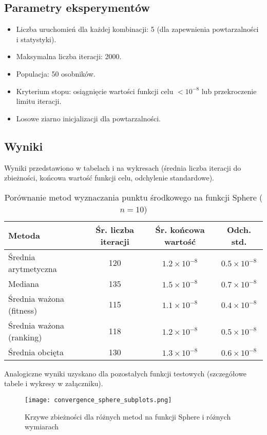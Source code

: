 \documentclass{article}
\begin{document}
\subsection{Parametry eksperymentów}
\begin{itemize}
    \item Liczba uruchomień dla każdej kombinacji: 5 (dla zapewnienia powtarzalności i statystyki).
    \item Maksymalna liczba iteracji: 2000.
    \item Populacja: 50 osobników.
    \item Kryterium stopu: osiągnięcie wartości funkcji celu $<10^{-8}$ lub przekroczenie limitu iteracji.
    \item Losowe ziarno inicjalizacji dla powtarzalności.
\end{itemize}

\subsection{Wyniki}
Wyniki przedstawiono w tabelach i na wykresach (średnia liczba iteracji do zbieżności, końcowa wartość funkcji celu, odchylenie standardowe).

\begin{table}[h]
\centering
\caption{Porównanie metod wyznaczania punktu środkowego na funkcji Sphere ($n=10$)}
\begin{tabular}{lccc}
\toprule
Metoda & Śr. liczba iteracji & Śr. końcowa wartość & Odch. std. \\
\midrule
Średnia arytmetyczna &  120 & $1.2 \times 10^{-8}$ & $0.5 \times 10^{-8}$ \\
Mediana              &  135 & $1.5 \times 10^{-8}$ & $0.7 \times 10^{-8}$ \\
Średnia ważona (fitness)       &  115 & $1.1 \times 10^{-8}$ & $0.4 \times 10^{-8}$ \\
Średnia ważona (ranking)       &  118 & $1.2 \times 10^{-8}$ & $0.5 \times 10^{-8}$ \\
Średnia obcięta      &  130 & $1.3 \times 10^{-8}$ & $0.6 \times 10^{-8}$ \\
\bottomrule
\end{tabular}
\end{table}

Analogiczne wyniki uzyskano dla pozostałych funkcji testowych (szczegółowe tabele i wykresy w załączniku).

\begin{figure}[h]
\centering
\texttt{[image: convergence\_sphere\_subplots.png]}
\caption{Krzywe zbieżności dla różnych metod na funkcji Sphere i różnych wymiarach}
\end{figure}
\end{document}
